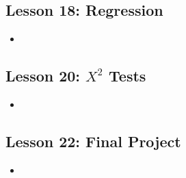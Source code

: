 \documentclass[twoside,12pt]{article}
\begin{document}
\subsection{Lesson 18: Regression}
\begin{itemize}
\item 
\end{itemize}

\subsection{Lesson 20: $X^2$ Tests}
\begin{itemize}
\item 
\end{itemize}

\subsection{Lesson 22: Final Project}
\begin{itemize}
\item 
\end{itemize}
\end{document}

